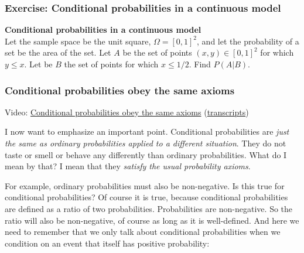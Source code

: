 \documentclass[pdftex, brazil, 12pt, twoside]{article}
\begin{document}
\subsubsection{Exercise: Conditional probabilities in a continuous model}
\label{un2-lec2-ex-cond-prob2}

\begin{exercise}
  \textbf{Conditional probabilities in a continuous model}\\
  Let the sample space be the unit square, $\Omega=[0,1]^2$, and let the probability
  of a set be the area of the set. Let $A$ be the set of points $(x,y) \in [0,1]^2$
  for which $y \le x$. Let be $B$ the set of points for which
  $x \le 1/2$. Find $P(A|B)$.
\end{exercise}

\subsubsection{Conditional probabilities obey the same axioms}
\label{un2-lec2-cond-prob-axioms}

Video: \href{https://www.youtube.com/watch?v=sn2wDa6SI\_E}{Conditional probabilities obey the same axioms}
(\href{Unit-2/01\_lecture\_2/l02\_6\_transcripts.pdf}{transcripts})

I now want to emphasize an important point.
Conditional probabilities are \emph{just the same as ordinary
probabilities applied to a different situation}.
They do not taste or smell or behave any differently than
ordinary probabilities.
What do I mean by that?
I mean that they \emph{satisfy the usual probability axioms}.

For example, ordinary probabilities must also be
non-negative.
Is this true for conditional probabilities?
Of course it is true, because conditional probabilities are
defined as a ratio of two probabilities.
Probabilities are non-negative.
So the ratio will also be non-negative, of course as
long as it is well-defined.
And here we need to remember that we only talk about
conditional probabilities when we condition on an event that
itself has positive probability:

\begin{figure}[H]
  \begin{center}
  \end{center}
\end{figure}
\end{document}
